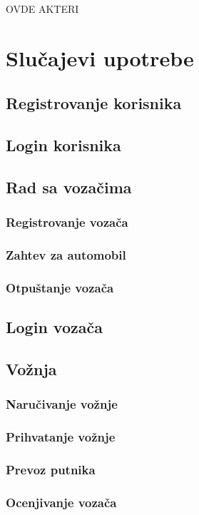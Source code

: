 \documentclass{article}
\begin{document}
OVDE AKTERI

\section{\bfseries Slu\v cajevi upotrebe}

\subsection{\bfseries Registrovanje korisnika}
\subsection{\bfseries Login korisnika}
\subsection{\bfseries Rad sa vozačima}
\subsubsection{\bfseries Registrovanje vozača}
\subsubsection{\bfseries Zahtev za automobil}
\subsubsection{\bfseries Otpuštanje vozača}
\subsection{\bfseries Login vozača}
\subsection{\bfseries Vožnja}
\subsubsection{\bfseries Naručivanje vožnje}
\subsubsection{\bfseries Prihvatanje vožnje}
\subsubsection{\bfseries Prevoz putnika}
\subsubsection{\bfseries Ocenjivanje voza\v ca}
\end{document}
